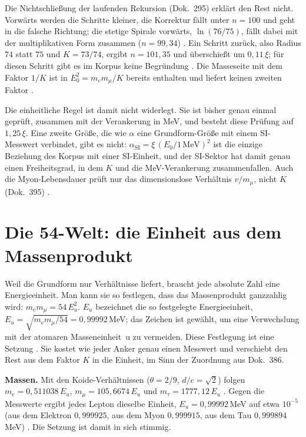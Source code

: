 Die Nichtschließung der laufenden Rekursion (Dok.~295) erklärt den Rest nicht. Vorwärts werden die
Schritte kleiner, die Korrektur fällt unter $n=100$ und geht in die falsche Richtung; die stetige
Spirale vorwärts, $\ln(76/75)$, fällt dabei mit der multiplikativen Form zusammen ($n=99{,}34$) \KM.
Ein Schritt zurück, also Radius $74$ statt $75$ und $K=73/74$, ergibt $n=101{,}35$ und überschießt um
$0{,}11\,\xi$; für diesen Schritt gibt es im Korpus keine Begründung \SM. Die Masseseite mit dem
Faktor $1/K$ ist in $E_0^2=m_em_\mu/K$ bereits enthalten und liefert keinen zweiten Faktor \BM.

Die einheitliche Regel ist damit nicht widerlegt. Sie ist bisher genau einmal geprüft, zusammen mit
der Verankerung in MeV, und besteht diese Prüfung auf $1{,}25\,\xi$. Eine zweite Größe, die wie $\alpha$ eine Grundform-Größe mit einem SI-Messwert
verbindet, gibt es nicht: $\alpha_{\text{SI}}=\xi\,(E_0/1\,\text{MeV})^2$ ist die einzige Beziehung des
Korpus mit einer SI-Einheit, und der SI-Sektor hat damit genau einen Freiheitsgrad, in dem $K$ und die
MeV-Verankerung zusammenfallen. Auch die Myon-Lebensdauer prüft nur das dimensionslose Verhältnis
$v/m_\mu$, nicht $K$ (Dok.~395) \BM.

\section{Die 54-Welt: die Einheit aus dem Massenprodukt}

Weil die Grundform nur Verhältnisse liefert, braucht jede absolute Zahl eine Energieeinheit. Man
kann sie so festlegen, dass das Massenprodukt ganzzahlig wird: $m_em_\mu=54\,E_u^2$. $E_u$ bezeichnet die so festgelegte Energieeinheit, $E_u=\sqrt{m_em_\mu/54}=0{,}99992$\,MeV; das Zeichen
ist gewählt, um eine Verwechslung mit der atomaren Masseneinheit~u zu vermeiden. Diese
Festlegung ist eine Setzung \SM. Sie kostet wie jeder Anker genau einen Messwert und verschiebt den Rest aus dem Faktor
$K$ in die Einheit, im Sinn der Zuordnung aus Dok.~386.

\textbf{Massen.} Mit den Koide-Verhältnissen ($\theta=2/9$, $d/c=\sqrt2$) folgen
$m_e=0{,}511038\,E_u$, $m_\mu=105{,}6674\,E_u$ und $m_\tau=1777{,}12\,E_u$ \KM. Gegen die Messwerte ergibt
jedes Lepton dieselbe Einheit, $E_u=0{,}99992$\,MeV auf etwa $10^{-5}$ (aus dem Elektron
$0{,}999925$, aus dem Myon $0{,}999915$, aus dem Tau $0{,}999894$\,MeV) \KM. Die Setzung ist damit
in sich stimmig.

